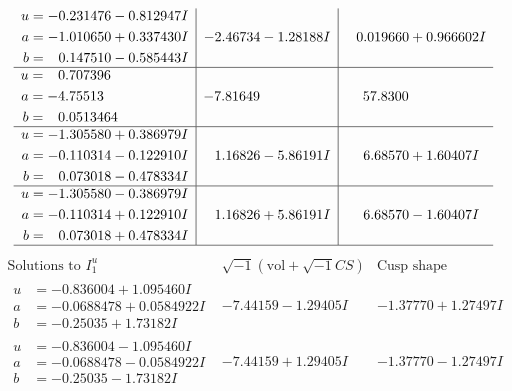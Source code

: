 \documentclass[1p]{elsarticle_modified}
\theoremstyle{definition}
\newcommand{\I}{\sqrt{-1}}
\begin{document}
$$\begin{array}{c|c|c}
\begin{aligned}
u &= -0.231476 - 0.812947 I \\
a &= -1.010650 + 0.337430 I \\
b &= \phantom{-}0.147510 - 0.585443 I\end{aligned}
 & -2.46734 - 1.28188 I & \phantom{-}0.019660 + 0.966602 I \\ \hline\begin{aligned}
u &= \phantom{-}0.707396\phantom{ +0.000000I} \\
a &= -4.75513\phantom{ +0.000000I} \\
b &= \phantom{-}0.0513464\phantom{ +0.000000I}\end{aligned}
 & -7.81649\phantom{ +0.000000I} & \phantom{-}57.8300\phantom{ +0.000000I} \\ \hline\begin{aligned}
u &= -1.305580 + 0.386979 I \\
a &= -0.110314 - 0.122910 I \\
b &= \phantom{-}0.073018 - 0.478334 I\end{aligned}
 & \phantom{-}1.16826 - 5.86191 I & \phantom{-}6.68570 + 1.60407 I \\ \hline\begin{aligned}
u &= -1.305580 - 0.386979 I \\
a &= -0.110314 + 0.122910 I \\
b &= \phantom{-}0.073018 + 0.478334 I\end{aligned}
 & \phantom{-}1.16826 + 5.86191 I & \phantom{-}6.68570 - 1.60407 I\\
 \hline 
 \end{array}$$\newpage$$\begin{array}{c|c|c}  
\text{Solutions to }I^u_{1}& \I (\text{vol} + \sqrt{-1}CS) & \text{Cusp shape}\\
 \hline 
\begin{aligned}
u &= -0.836004 + 1.095460 I \\
a &= -0.0688478 + 0.0584922 I \\
b &= -0.25035 + 1.73182 I\end{aligned}
 & -7.44159 - 1.29405 I & -1.37770 + 1.27497 I \\ \hline\begin{aligned}
u &= -0.836004 - 1.095460 I \\
a &= -0.0688478 - 0.0584922 I \\
b &= -0.25035 - 1.73182 I\end{aligned}
 & -7.44159 + 1.29405 I & -1.37770 - 1.27497 I \\ \hline\begin{aligned}

\end{aligned}
\end{array}$$
\end{document}

